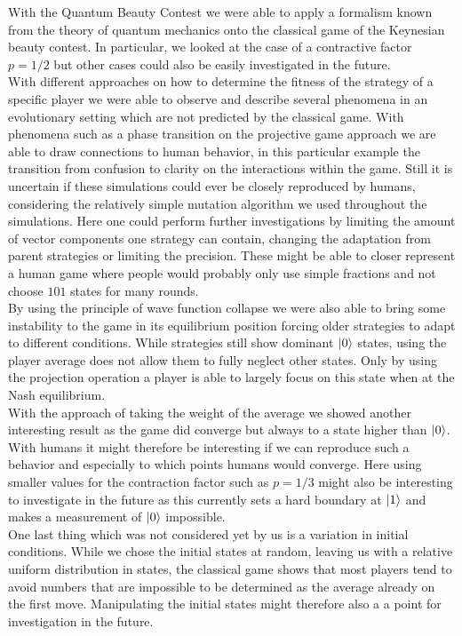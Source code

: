With the Quantum Beauty Contest we were able to apply a formalism known from the theory of quantum mechanics onto the classical game of the Keynesian beauty contest. In particular, we looked at the case of a contractive factor $p = 1/2$ but other cases could also be easily investigated in the future.\\

With different approaches on how to determine the fitness of the strategy of a specific player we were able to observe and describe several phenomena in an evolutionary setting which are not predicted by the classical game. With phenomena such as a phase transition on the projective game approach we are able to draw connections to human behavior, in this particular example the transition from confusion to clarity on the interactions within the game. Still it is uncertain if these simulations could ever be closely reproduced by humans, considering the relatively simple mutation algorithm we used throughout the simulations. Here one could perform further investigations by limiting the amount of vector components one strategy can contain, changing the adaptation from parent strategies or limiting the precision. These might be able to closer represent a human game where people would probably only use simple fractions and not choose $101$ states for many rounds.\\

By using the principle of wave function collapse we were also able to bring some instability to the game in its equilibrium position forcing older strategies to adapt to different conditions. While strategies still show dominant $\ket{0}$ states, using the player average does not allow them to fully neglect other states. Only by using the projection operation a player is able to largely focus on this state when at the Nash equilibrium.\\

With the approach of taking the weight of the average we showed another interesting result as the game did converge but always to a state higher than $\ket{0}$. With humans it might therefore be interesting if we can reproduce such a behavior and especially to which points humans would converge. Here using smaller values for the contraction factor such as $p = 1/3$ might also be interesting to investigate in the future as this currently sets a hard boundary at $\ket{1}$ and makes a measurement of $\ket{0}$ impossible.\\

One last thing which was not considered yet by us is a variation in initial conditions. While we chose the initial states at random, leaving us with a relative uniform distribution in states, the classical game shows that most players tend to avoid numbers that are impossible to be determined as the average already on the first move. Manipulating the initial states might therefore also a a point for investigation in the future.\\